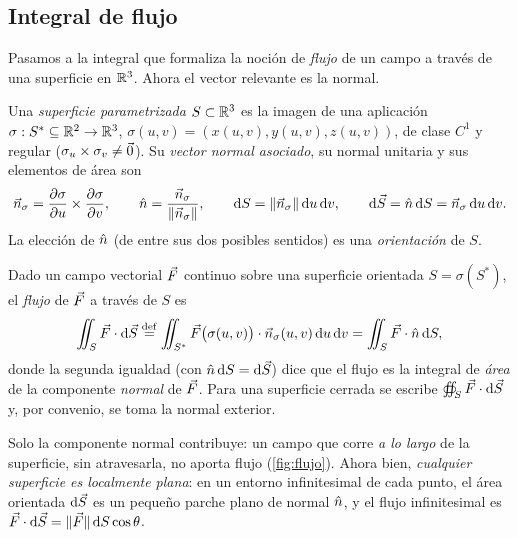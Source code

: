 

\subsection{Integral de flujo}\label{sec:flujo}
Pasamos a la integral que formaliza la noción de \emph{flujo} de un campo a
través de una superficie en $\mathbb{R}^{3}$. Ahora el vector relevante es la normal.

\begin{definicion}\label{def:superficie}
Una \emph{superficie parametrizada} $S\subset\mathbb{R}^{3}$ es la imagen de una
aplicación $\sigma:S^{*}\subseteq\mathbb{R}^{2}\to\mathbb{R}^{3}$, $\sigma(u,v)=(x(u,v),y(u,v),z(u,v))$,
de clase $C^{1}$ y regular ($\sigma_u\times\sigma_v\neq\vec{0}$). Su \emph{vector
normal asociado}, su normal unitaria y sus elementos de área son
\[
  \vec{n}_\sigma=\frac{\partial\sigma}{\partial u}\times\frac{\partial\sigma}{\partial v},
  \qquad
  \hat{n}=\frac{\vec{n}_\sigma}{\lVert \vec{n}_\sigma\rVert},
  \qquad
  \mathrm{d} S=\lVert \vec{n}_\sigma\rVert\,\mathrm{d} u\,\mathrm{d} v,
  \qquad
  \mathrm{d}\vec{S}=\hat{n}\,\mathrm{d} S=\vec{n}_\sigma\,\mathrm{d} u\,\mathrm{d} v .
\]
La elección de $\hat{n}$ (de entre sus dos posibles sentidos) es una
\emph{orientación} de $S$.
\end{definicion}

\begin{definicion}\label{def:flujo}
Dado un campo vectorial $\vec{F}$ continuo sobre una superficie orientada
$S=\sigma(S^{*})$, el \emph{flujo} de $\vec{F}$ a través de $S$ es
\begin{equation}\label{eq:flujo}
  \iint_{S}\vec{F}\cdot\mathrm{d}\vec{S}\mathrel{\overset{\mathrm{def}}{=}}\iint_{S^{*}}\vec{F}\bigl(\sigma(u,v)\bigr)\cdot\vec{n}_\sigma(u,v)\,\mathrm{d} u\,\mathrm{d} v
  =\iint_{S}\vec{F}\cdot\hat{n}\,\mathrm{d} S ,
\end{equation}
donde la segunda igualdad (con $\hat{n}\,\mathrm{d} S=\mathrm{d}\vec{S}$) dice que el flujo es la integral
de \emph{área} de la componente \emph{normal} de $\vec{F}$. Para una superficie
cerrada se escribe $\oiint_S\vec{F}\cdot\mathrm{d}\vec{S}$ y, por convenio, se toma la normal
exterior.
\end{definicion}

Solo la componente normal contribuye: un campo que corre \emph{a lo largo} de la
superficie, sin atravesarla, no aporta flujo (\cref{fig:flujo}). Ahora bien,
\emph{cualquier superficie es localmente plana}: en un entorno infinitesimal de
cada punto, el área orientada $\mathrm{d}\vec{S}$ es un pequeño parche plano de normal $\hat{n}$,
y el flujo infinitesimal es $\vec{F}\cdot\mathrm{d}\vec{S}=\lVert \vec{F}\rVert\,\mathrm{d} S\cos\theta$.


